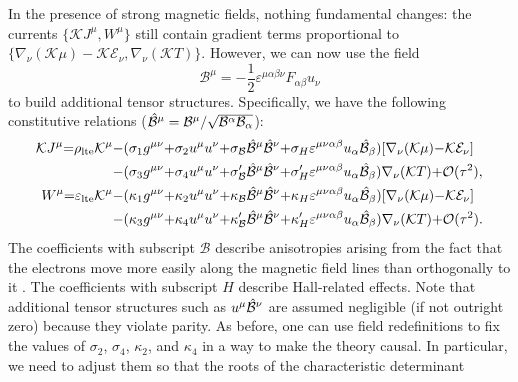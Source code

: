 \documentclass[a4paper, amsfonts, amssymb, amsmath, reprint, showkeys, nofootinbib, twoside,notitlepage]{revtex4-1}
\newcommand{\K}{{\mathcal{K}}}
\theoremstyle{definition}
\theoremstyle{theorem}
\begin{document}
In the presence of strong magnetic fields, nothing fundamental changes: the currents $\{\K J^\mu,W^\mu\}$ still contain gradient terms proportional to $\{\nabla_\nu(\K\mu){-}\K \mathcal{E}_\nu,\nabla_\nu(\K T)\}$. However, we can now use the field 
\begin{equation}
\mathcal{B}^\mu =-\dfrac{1}{2} \varepsilon^{\mu\alpha\beta\nu}F_{\alpha\beta}u_\nu 
\end{equation}
to build additional tensor structures. Specifically, we have the following constitutive relations ($\Hat{\mathcal{B}}^\mu=\mathcal{B}^\mu/\sqrt{\mathcal{B}^\alpha\mathcal{B}_\alpha}$):
\begin{equation}
\begin{split}
\K J^\mu {=}\rho_{\text{lte}} \K^\mu & {-}(\sigma_1 g^{\mu \nu}{+}\sigma_2 u^\mu u^\nu{+}\sigma_\mathcal{B} \Hat{\mathcal{B}}^\mu \Hat{\mathcal{B}}^\nu{+}\sigma_H \varepsilon^{\mu \nu \alpha\beta}u_\alpha\Hat{\mathcal{B}}_\beta) [\nabla_\nu (\K\mu){-}\K\mathcal{E}_\nu] \\
& {-}(\sigma_3 g^{\mu \nu}{+}\sigma_4 u^\mu u^\nu{+}\sigma'_\mathcal{B} \Hat{\mathcal{B}}^\mu \Hat{\mathcal{B}}^\nu{+}\sigma'_H \varepsilon^{\mu \nu \alpha\beta}u_\alpha\Hat{\mathcal{B}}_\beta) \nabla_\nu (\K T) {+}\mathcal{O}(\tau^2) , \\
W^\mu {=}\varepsilon_{\text{lte}} \K^\mu & {-}(\kappa_1 g^{\mu \nu}{+}\kappa_2 u^\mu u^\nu{+}\kappa_\mathcal{B} \Hat{\mathcal{B}}^\mu \Hat{\mathcal{B}}^\nu{+}\kappa_H \varepsilon^{\mu \nu \alpha\beta}u_\alpha\Hat{\mathcal{B}}_\beta) [\nabla_\nu (\K\mu){-}\K \mathcal{E}_\nu] \\
& {-}(\kappa_3 g^{\mu \nu}{+}\kappa_4 u^\mu u^\nu{+}\kappa'_\mathcal{B} \Hat{\mathcal{B}}^\mu \Hat{\mathcal{B}}^\nu{+}\kappa'_H \varepsilon^{\mu \nu \alpha\beta}u_\alpha\Hat{\mathcal{B}}_\beta) \nabla_\nu (\K T) {+}\mathcal{O}(\tau^2). \\
\end{split}
\end{equation}
The coefficients with subscript $\mathcal{B}$ describe anisotropies arising from the fact that the electrons move more easily along the magnetic field lines than orthogonally to it \cite{Aguilera:2007xk}. The coefficients with subscript $H$ describe Hall-related effects. Note that additional tensor structures such as $u^\mu \Hat{\mathcal{B}}^\nu$ are assumed negligible (if not outright zero) because they violate parity.
As before, one can use field redefinitions to fix the values of $\sigma_2$, $\sigma_4$, $\kappa_2$, and $\kappa_4$ in a way to make the theory causal. In particular, we need to adjust them so that the roots of the characteristic determinant
\end{document}
